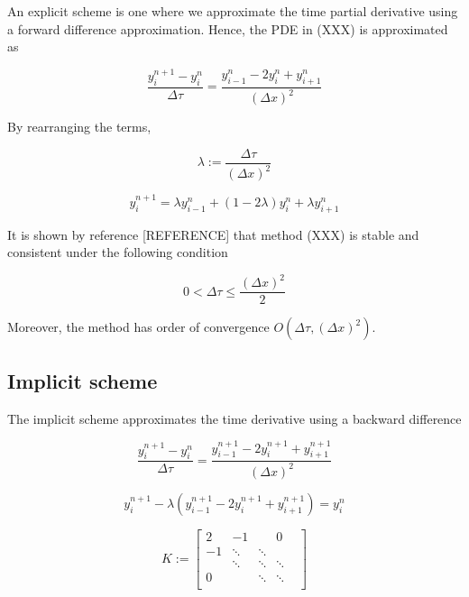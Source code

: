 An explicit scheme is one where we approximate the time partial derivative using
a forward difference approximation. Hence, the PDE in (XXX) is approximated as

\begin{equation}
  \dfrac{y^{n+1}_{i} - y^{n}_{i}}{\Delta \tau} = \dfrac{y^{n}_{i-1} - 2y^{n}_{i} + y^{n}_{i+1}}{(\Delta x)^2}
\end{equation}

By rearranging the terms,

\begin{equation}
  \lambda := \dfrac{\Delta \tau}{(\Delta x)^2}
\end{equation}

\begin{equation}
  y^{n+1}_i = \lambda y^{n}_{i-1} + (1 - 2\lambda)y^{n}_{i} + \lambda y^{n}_{i+1}
\end{equation}

It is shown by reference [REFERENCE] that method (XXX) is stable and consistent 
under the following condition

\begin{equation}
  0 < \Delta \tau \le \dfrac{(\Delta x)^2}{2}
\end{equation}

Moreover, the method has order of convergence $O(\Delta \tau, (\Delta x)^{2})$.

\subsection{Implicit scheme}

The implicit scheme approximates the time derivative using a backward difference

\begin{equation}
  \dfrac{y^{n+1}_{i} - y^{n}_{i}}{\Delta \tau} = \dfrac{y^{n+1}_{i-1} - 2y^{n+1}_{i} + y^{n+1}_{i+1}}{(\Delta x)^2}
\end{equation}

\begin{equation}
  y^{n+1}_{i} - \lambda (y^{n+1}_{i-1} - 2y^{n+1}_{i} + y^{n+1}_{i+1}) = y^{n}_{i}  
\end{equation}

\begin{equation}
  K := \begin{bmatrix}
    2 & -1     & & 0 \\ 
   -1 & \ddots & \ddots \\
      & \ddots & \ddots & \ddots \\
    0 & & \ddots & \ddots & \\
  \end{bmatrix} 
\end{equation}

